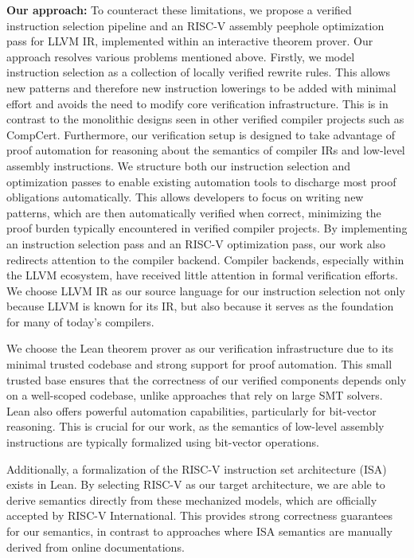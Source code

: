 \textbf{Our approach:} To counteract these limitations, we propose a verified instruction selection pipeline and an RISC-V assembly peephole optimization pass for LLVM IR, implemented within an interactive theorem prover. Our approach resolves various problems mentioned above. Firstly, we model instruction selection as a collection of locally verified rewrite rules. This allows new patterns and therefore new instruction lowerings to be added with minimal effort and avoids the need to modify core verification infrastructure. This is in contrast to the monolithic designs seen in other verified compiler projects such as CompCert. Furthermore, our verification setup is designed to take advantage of proof automation for reasoning about the semantics of compiler IRs and low-level assembly instructions. We structure both our instruction selection and optimization passes to enable existing automation tools to discharge most proof obligations automatically. This allows developers to focus on writing new patterns, which are then automatically verified when correct, minimizing the proof burden typically encountered in verified compiler projects. By implementing an instruction selection pass and an RISC-V optimization pass, our work also redirects attention to the compiler backend. Compiler backends, especially within the LLVM ecosystem, have received little attention in formal verification efforts. We choose LLVM IR as our source language for our instruction selection not only because LLVM is known for its IR, but also because it serves as the foundation for many of today's compilers. 

We choose the Lean theorem prover as our verification infrastructure due to its minimal trusted codebase and strong support for proof automation. This small trusted base ensures that the correctness of our verified components depends only on a well-scoped codebase, unlike approaches that rely on large SMT solvers. Lean also offers powerful automation capabilities, particularly for bit-vector reasoning. This is crucial for our work, as the semantics of low-level assembly instructions are typically formalized using bit-vector operations.

Additionally, a formalization of the RISC-V instruction set architecture (ISA) exists in Lean. By selecting RISC-V as our target architecture, we are able to derive semantics directly from these mechanized models, which are officially accepted by RISC-V International. This provides strong correctness guarantees for our semantics, in contrast to approaches where ISA semantics are manually derived from online documentations.

